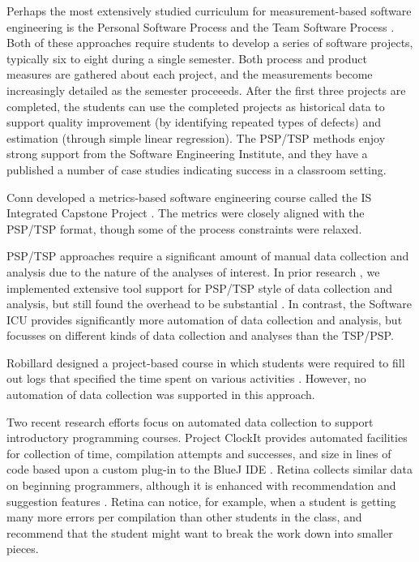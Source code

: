 \documentclass{acm_proc_article-sp}
\begin{document}
Perhaps the most extensively studied curriculum for measure\-ment-based
software engineering is the Personal Software Process \cite{Humphrey95} and
the Team Software Process \cite{Humphrey00}.  Both of these approaches
require students to develop a series of software projects, typically six to
eight during a single semester.  Both process and product measures are
gathered about each project, and the measurements become increasingly
detailed as the semester proceeeds. After the first three projects are
completed, the students can use the completed projects as historical data
to support quality improvement (by identifying repeated types of defects)
and estimation (through simple linear regression).  The PSP/TSP methods
enjoy strong support from the Software Engineering Institute, and they have
a published a number of case studies indicating success in a classroom setting. 

Conn developed a metrics-based software engineering course called the 
IS Integrated Capstone Project \cite{Conn04}.  The metrics were closely aligned
with the PSP/TSP format, though some of the process constraints were relaxed. 

PSP/TSP approaches require a significant amount of manual data
collection and analysis due to the nature of the analyses of interest. In
prior research \cite{csdl2-00-03}, we implemented extensive tool support
for PSP/TSP style of data collection and analysis, but still found the
overhead to be substantial \cite{csdl2-01-12}. In contrast, the Software ICU provides
significantly more automation of data collection and analysis, but focusses
on different kinds of data collection and analyses than the TSP/PSP.

Robillard designed a project-based course in which students were required
to fill out logs that specified the time spent on various activities
\cite{Robillard98}.  However, no automation of data collection was supported in this
approach. 

Two recent research efforts focus on automated data collection to support
introductory programming courses.  Project ClockIt provides automated
facilities for collection of time, compilation attempts and successes, and
size in lines of code based upon a custom plug-in to the BlueJ IDE
\cite{Norris08, Barry05}.  Retina collects similar data on beginning
programmers, although it is enhanced with recommendation and suggestion
features \cite{Murphy09}.  Retina can notice, for example, when a student
is getting many more errors per compilation than other students in the
class, and recommend that the student might want to break the work down
into smaller pieces.
\end{document}
